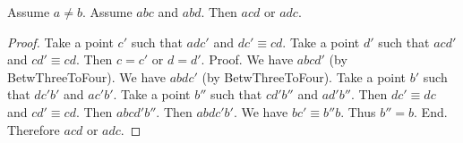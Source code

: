 \documentclass[10pt,a4paper,parskip=half,numbers=endperiod,headings=standardclasses,parskip]{scrbook}
\newcommand{\Cong}[4]{#1 #2 \equiv #3 #4}
\newcommand{\Betw}[3]{#1 #2 #3}
\newcommand{\Col}[3]{\operatorname{Col}(#1, #2, #3)}
\newcommand{\BetwFour}[4]{#1 #2 #3 #4}
\newcommand{\BetwFive}[5]{#1 #2 #3 #4 #5}
\newcommand{\bprime}{b'}
\newcommand{\cprime}{c'}
\def\dprime{d'}
\newcommand{\bdoubleprime}{b''}
\newcommand{\OFS}[8]{\operatorname{OFS}
\left(\begin{smallmatrix}%
#1 & #2 & #3 & #4 \\
#5 & #6 & #7 & #8
\end{smallmatrix}\right)%
}
\newcommand{\IFS}[8]{\operatorname{IFS}
\left(\begin{smallmatrix}%
#1 & #2 & #3 & #4 \\
#5 & #6 & #7 & #8
\end{smallmatrix}\right)%
}
\begin{document}
  \begin{forthel}

    \begin{lemma}[Gupta] %
      Assume $a \neq b$.
      Assume $\Betw{a}{b}{c}$ and $\Betw{a}{b}{d}$.
      Then $\Betw{a}{c}{d}$ or $\Betw{a}{d}{c}$.
    \end{lemma}

    \begin{proof}
      Take a point $\cprime$ such that
        $\Betw{a}{d}{\cprime}$ and $\Cong{d}{\cprime}{c}{d}$.
      Take a point $\dprime$ such that
        $\Betw{a}{c}{\dprime}$ and $\Cong{c}{\dprime}{c}{d}$.
      Then $c = \cprime$ or $d = \dprime$. %
      Proof.
        We have $\BetwFour{a}{b}{c}{\dprime}$ (by BetwThreeToFour).
        We have $\BetwFour{a}{b}{d}{\cprime}$ (by BetwThreeToFour).
        Take a point $\bprime$ such that $\Betw{d}{\cprime}{\bprime}$ and $\Betw{a}{\cprime}{\bprime}$.
        Take a point $\bdoubleprime$ such that $\Betw{c}{\dprime}{\bdoubleprime}$ and $\Betw{a}{\dprime}{\bdoubleprime}$.
        Then $\Cong{d}{\cprime}{d}{c}$ and $\Cong{c}{\dprime}{c}{d}$.
        Then $\BetwFive{a}{b}{c}{\dprime}{\bdoubleprime}$.
        Then $\BetwFive{a}{b}{d}{\cprime}{\bprime}$.
        We have $\Cong{b}{\cprime}{\bdoubleprime}{b}$.
        Thus $\bdoubleprime = b$.
      End.
      Therefore $\Betw{a}{c}{d}$ or $\Betw{a}{d}{c}$. %
    \end{proof}
  \end{forthel}
\end{document}
